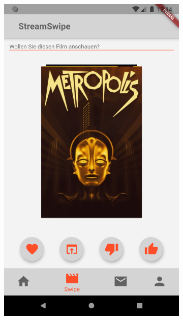 \begin{figure}[tbt]
	\begin{subfigure}{0.5\textwidth}
	\centering
	\includegraphics[scale=0.15]{Barrierefreiheit/images/bsp-swipe.png}
	\caption{}
	\label{fig:bf-beispiel_a}
	\end{subfigure}
	\begin{subfigure}{0.5\textwidth}
	\centering

\end{subfigure}
\end{figure}

